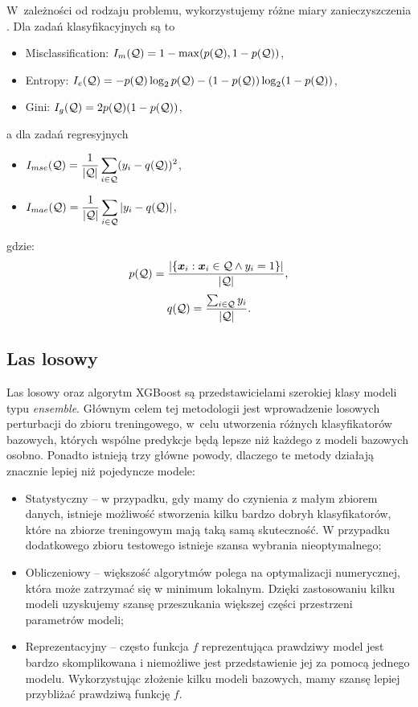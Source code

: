\documentclass[inzynierska]{pwr_wmat_praca_dyplomowa}
\theoremstyle{plain}
\numberwithin{theorem}{chapter}
\theoremstyle{definition}
\numberwithin{theorem}{chapter}
\begin{document}
W~zależności od rodzaju problemu, wykorzystujemy różne miary zanieczyszczenia \cite{sklearn_api}. Dla zadań klasyfikacyjnych są to
\begin{itemize}
	\item Misclassification: $I_m(\mathcal{Q}) = 1 - \max(p(\mathcal{Q}), 1 - p(\mathcal{Q}))$,
	\item Entropy: $I_e(\mathcal{Q}) = -p(\mathcal{Q}) \log_2 p(\mathcal{Q}) - (1 - p(\mathcal{Q})) \log_2(1 - p(\mathcal{Q}))$,
	\item Gini: $I_g(\mathcal{Q}) = 2p(\mathcal{Q})(1 - p(\mathcal{Q}))$,
\end{itemize}{}
a dla zadań regresyjnych
\begin{itemize}
	\item $ \displaystyle I_{mse}(\mathcal{Q}) = \frac{1}{|\mathcal{Q}|} \sum_{i \in \mathcal{Q}} (y_i - q(\mathcal{Q}))^2$,
	\item $ \displaystyle I_{mae}(\mathcal{Q}) = \frac{1}{|\mathcal{Q}|} \sum_{i \in \mathcal{Q}} |y_i - q(\mathcal{Q})|$,
\end{itemize}
gdzie:
$$ p(\mathcal{Q}) = \frac{| \{ \boldsymbol{x}_i : \boldsymbol{x}_i \in \mathcal{Q} \land y_i = 1 \}|}{|\mathcal{Q}|} \text{,} $$
$$ q(\mathcal{Q}) = \frac{\sum_{i \in \mathcal{Q}} y_i}{|\mathcal{Q}|} \text{.} $$

\subsection{Las losowy}
Las losowy oraz algorytm XGBoost są przedstawicielami szerokiej klasy modeli typu \textit{ensemble}. Głównym celem tej metodologii jest wprowadzenie losowych perturbacji do zbioru treningowego, w~celu utworzenia różnych klasyfikatorów bazowych, których wspólne predykcje będą lepsze niż każdego z modeli bazowych osobno. Ponadto istnieją trzy główne powody, dlaczego te metody działają znacznie lepiej niż pojedyncze modele:
\begin{itemize}
	\item Statystyczny -- w przypadku, gdy mamy do czynienia z małym zbiorem danych, istnieje możliwość stworzenia kilku bardzo dobryh klasyfikatorów, które na zbiorze treningowym mają taką samą skuteczność. W przypadku dodatkowego zbioru testowego istnieje szansa wybrania nieoptymalnego;
	\item Obliczeniowy -- większość algorytmów polega na optymalizacji numerycznej, która może zatrzymać się w minimum lokalnym. Dzięki zastosowaniu kilku modeli uzyskujemy szansę przeszukania większej części przestrzeni parametrów modeli;
	\item Reprezentacyjny -- często funkcja $f$ reprezentująca prawdziwy model jest bardzo skomplikowana i niemożliwe jest przedstawienie jej za pomocą jednego modelu. Wykorzystując złożenie kilku modeli bazowych, mamy szansę lepiej przybliżać prawdziwą funkcję $f$.
\end{itemize}
\end{document}
